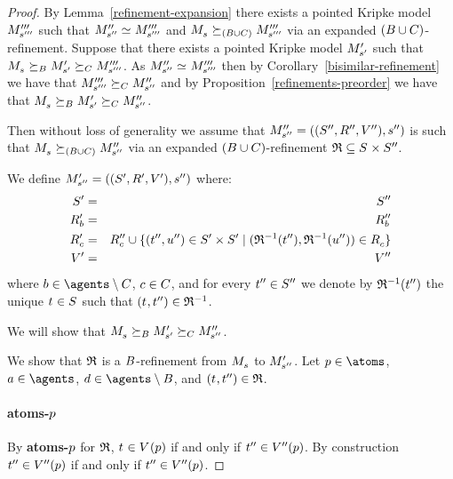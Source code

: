\begin{proof}
By Lemma~\ref{refinement-expansion} there exists a pointed Kripke model ${M^{\prime\prime\prime}_{{s}^{\prime\prime\prime}}}$ such that $\kPModelPP{\kStateSPP} \bisimilar \kPModelPPP{\kStateSPPP}$ and $\kPModel{\kStateS} \simulates[(\agentsB \cup \agentsC)] \kPModelPPP{\kStateSPPP}$ via an expanded $(B \cup C)$-refinement.
Suppose that there exists a pointed Kripke model ${M^{\prime}_{{s}^{\prime}}}$ such that $\kPModel{\kStateS} \simulatesBs \kPModelP{\kStateSP} \simulatesCs \kPModelPPP{\kStateSPPP}$.
As $\kPModelPP{\kStateSPP} \bisimilar \kPModelPPP{\kStateSPPP}$ then by Corollary~\ref{bisimilar-refinement} we have that ${M^{\prime\prime\prime}_{{s}^{\prime\prime\prime}}} \succeq_{C} {M^{\prime\prime}_{{s}^{\prime\prime}}}$ and by Proposition~\ref{refinements-preorder} we have that $\kPModel{\kStateS} \simulatesBs \kPModelP{\kStateSP} \simulatesCs \kPModelPP{\kStateSPP}$.

Then without loss of generality we assume that $\kPModelAndTuplePP{\kStateSPP}$ is such that $\kPModel{\kStateS} \simulates[(\agentsB \cup \agentsC)] \kPModelPP{\kStateSPP}$ via an expanded $(B \cup C)$-refinement $\refinement \subseteq \kStates \times \kStatesPP$.

We define $\kPModelAndTupleP{\kStateSPP}$ where:
\begin{eqnarray*}
    \kStatesP &=& \kStatesPP\\
    \kAccessibilityPB &=& \kAccessibilityPPB\\
    \kAccessibilityPC &=& \kAccessibilityPPC \cup \{(\kStateTPP, \kStateUPP) \in \kStatesP \times \kStatesP \mid (\refinement^{-1}(\kStateTPP), \refinement^{-1}(\kStateUPP)) \in \kAccessibilityC \}\\
    \kValuationP &=& \kValuationPP
\end{eqnarray*}
where $\agentB \in \agents \setminus \agentsC$, $c \in C$, and for every ${t}^{\prime\prime} \in {S^{\prime\prime}}$ we denote by $\mathfrak{R}^{-1}({t}^{\prime\prime})$ the unique $\kStateT \in \kStates$ such that $(\kStateT, \kStateTPP) \in \refinement^{-1}$.

We will show that $\kPModel{\kStateS} \simulatesBs \kPModelP{\kStateSP} \simulatesCs \kPModelPP{\kStateSPP}$.

We show that $\mathfrak{R}$ is a $B$-refinement from $\kPModel{\kStateS}$ to ${M^{\prime}_{{s}^{\prime\prime}}}$.
Let $\atomP \in \atoms$, $\agentA \in \agents$, $\agentD \in \agents \setminus \agentsB$, and $(\kStateT, \kStateTPP) \in \refinement$.

\paragraph{atoms-$p$}
By {\bf atoms-$p$} for $\mathfrak{R}$, $\kStateT \in \kValuation(\atomP)$ if and only if ${t}^{\prime\prime} \in {V^{\prime\prime}}(p)$.
By construction ${t}^{\prime\prime} \in {V^{\prime\prime}}(p)$ if and only if ${t}^{\prime\prime} \in {V^{\prime\prime}}(p)$.


\end{proof}
